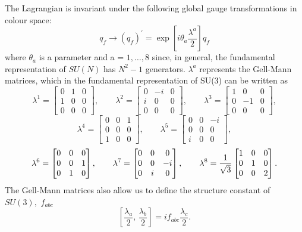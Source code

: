 \documentclass[10pt,a4paper]{book}
\begin{document}
The Lagrangian is invariant under the following global gauge transformations in colour space:
\begin{equation}
q_f \rightarrow (q_f)^\prime = \exp[i\theta_a\frac{\lambda^a}{2}]q_f
\end{equation}
where $\theta_a$ is a parameter and a = $1, \dots, 8$ since, in general, the fundamental representation of $SU(N)$ has $N^2 - 1$ generators. $\lambda^a$ represents the Gell-Mann matrices, which in the fundamental representation of SU(3) can be written as
\begin{equation*}
\lambda^1 = \begin{bmatrix} 0 & 1 & 0 \\ 1 & 0 & 0 \\ 0 & 0 & 0 \end{bmatrix}, \qquad
\lambda^2 = \begin{bmatrix} 0 & -i & 0 \\ i & 0 & 0 \\ 0 & 0 & 0 \end{bmatrix}, \qquad
\lambda^3 = \begin{bmatrix} 1 & 0 & 0 \\ 0 & -1 & 0 \\ 0 & 0 & 0 \end{bmatrix},
\end{equation*}
\begin{equation}
\lambda^4 = \begin{bmatrix} 0 & 0 & 1 \\ 0 & 0 & 0 \\ 1 & 0 & 0 \end{bmatrix}, \qquad
\lambda^5 = \begin{bmatrix} 0 & 0 & -i \\ 0 & 0 & 0 \\ i & 0 & 0 \end{bmatrix},
\end{equation}
\begin{equation*}
\lambda^6 = \begin{bmatrix} 0 & 0 & 0 \\ 0 & 0 & 1 \\ 0 & 1 & 0 \end{bmatrix},\qquad
\lambda^7 = \begin{bmatrix} 0 & 0 & 0 \\ 0 & 0 & -i \\ 0 & i & 0 \end{bmatrix}, \qquad
\lambda^8 = \frac{1}{\sqrt{3}} \begin{bmatrix} 1 & 0 & 0 \\ 0 & 1 & 0 \\ 0 & 0 & 2
\end{bmatrix}.\\
\end{equation*}
The Gell-Mann matrices also allow us to define the structure constant of $SU(3),$ $f_{abc}$
\begin{equation}
\left[\frac{\lambda_a}{2}, \, \frac{\lambda_b}{2}\right] = if_{abc}\frac{\lambda_c}{2}. 
\end{equation}
\end{document}
